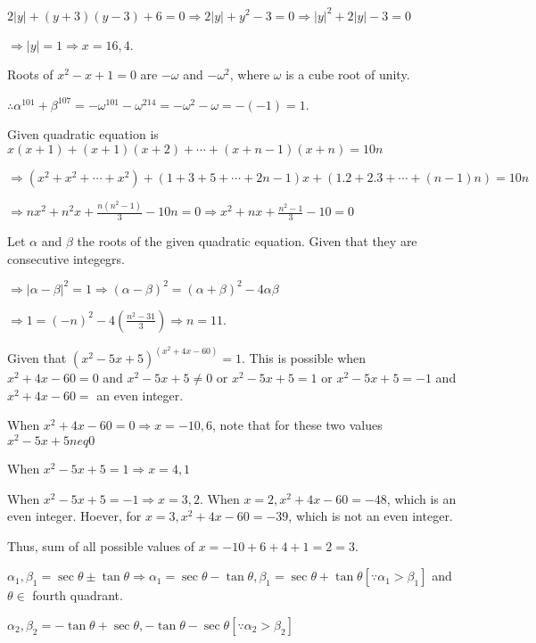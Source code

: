   $2|y| + (y + 3)(y - 3) + 6 = 0 \Rightarrow 2|y| + y^2 - 3 = 0\Rightarrow |y|^2 + 2|y| - 3 = 0$

  $\Rightarrow |y| = 1\Rightarrow x = 16, 4$.
\item Roots of $x^2 - x + 1 = 0$ are $-\omega$ and $-\omega^2$, where $\omega$ is a cube root of unity.

  $\therefore \alpha^{101} + \beta^{107} = -\omega^{101} -\omega^{214} = -\omega^2 - \omega = -(-1) = 1$.
\item Given quadratic equation is $x(x + 1) + (x + 1)(x + 2) + \cdots + (x + n - 1)(x + n) = 10n$

  $\Rightarrow \left(x^2 + x^2 + \cdots + x^2\right) + \left(1 + 3 + 5 + \cdots + 2n - 1\right)x + \left(1.2
  + 2.3 + \cdots + (n - 1)n \right) = 10n$

  $\Rightarrow nx^2 + n^2x + \frac{n\left(n^2 - 1\right)}{3} - 10n = 0\Rightarrow x^2 + nx + \frac{n^2 -
    1}{3} - 10 = 0$

  Let $\alpha$ and $\beta$ the roots of the given quadratic equation. Given that they are consecutive
  integegrs.

  $\Rightarrow |\alpha - \beta|^2 = 1\Rightarrow (\alpha - \beta)^2 = (\alpha + \beta)^2 - 4\alpha\beta$

  $\Rightarrow 1 = \left(-n\right)^2 - 4\left(\frac{n^2 - 31}{3}\right)\Rightarrow n = 11$.
\item Given that $\left(x^2 - 5x + 5\right)^{\left(x^2 + 4x - 60\right)} = 1$. This is possible when $x^2 +
  4x - 60 = 0$ and $x^2 - 5x + 5\neq 0$ or $x^2 - 5x + 5 = 1$ or $x^2 - 5x + 5 = -1$ and $x^2 + 4x - 60 =$
  an even integer.

  When $x^2 + 4x - 60 = 0\Rightarrow x = -10, 6$, note that for these two values $x^2 - 5x + 5 neq 0$

  When $x^2 - 5x + 5 = 1\Rightarrow x = 4, 1$

  When $x^2 - 5x + 5 = -1 \Rightarrow x = 3, 2$. When $x = 2, x^2 + 4x - 60 = -48$, which is an even
  integer. Hoever, for $x = 3, x^2 + 4x - 60 = -39$, which is not an even integer.

  Thus, sum of all possible values of $x = -10 + 6 + 4 + 1 = 2 = 3$.
\item $\alpha_1, \beta_1 = \sec\theta\pm\tan\theta\Rightarrow \alpha_1 = \sec\theta - \tan\theta, \beta_1
  = \sec\theta + \tan\theta[\because \alpha_1 > \beta_1]$ and $\theta\in$ fourth quadrant.

  $\alpha_2, \beta_2 = -\tan\theta + \sec\theta, -\tan\theta - \sec\theta[\because \alpha_2 > \beta_2]$

